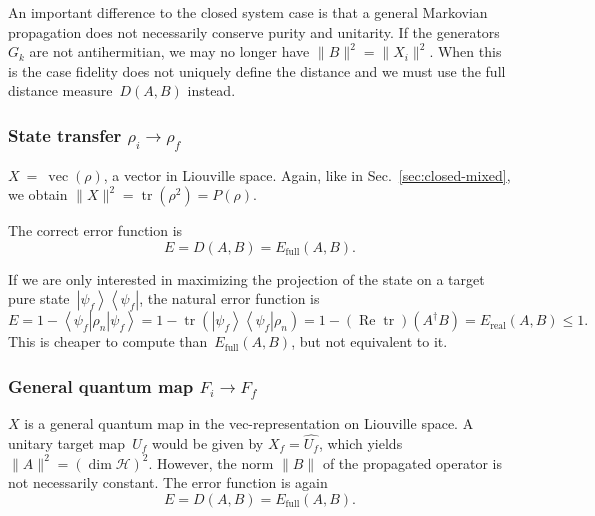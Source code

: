 \documentclass[aps, pra, a4paper, longbibliography, superscriptaddress]{revtex4-1}
\newcommand{\I}{\openone}
\newcommand{\be}{\begin{equation}}
\newcommand{\ee}{\end{equation}}
\newcommand{\eq}{\Leftrightarrow}
\newcommand{\ket}[1]{\left| #1 \right \rangle}
\newcommand{\bra}[1]{\left \langle #1 \right|}
\newcommand{\ketbra}[2]{\left| #1 \right \rangle \left \langle #2 \right|}
\newcommand{\hilb}[1]{\mathcal{#1}}
\DeclareMathOperator{\tr}{tr}
\DeclareMathOperator{\re}{Re}
\DeclareMathOperator{\cvec}{vec}
\newcommand{\vecop}[1]{\widehat{#1}}
\begin{document}
An important difference to the closed system case is that a general Markovian propagation
does not necessarily conserve purity and unitarity.
If the generators~$G_k$ are not antihermitian, we may no longer have
$\|B\|^2 = \|X_i\|^2$. When this is the case
fidelity does not uniquely define the distance and we must use the
full distance measure~$D(A,B)$ instead.






\subsubsection{State transfer $\rho_i \to \rho_f$}

$X~=~\cvec(\rho)$, a vector in Liouville space. Again, like in
Sec.~\ref{sec:closed-mixed}, we obtain
$\|X\|^2 = \tr(\rho^2) = P(\rho)$.

The correct error function is
\be
E
= D(A, B)
= E_\text{full}(A, B).
\ee

If we are only interested in maximizing the projection of
the state on a target pure state~$\ketbra{\psi_f}{\psi_f}$, the natural error
function is
\be
E
= 1 -\bra{\psi_f} \rho_n \ket{\psi_f}
= 1 -\tr\left(\ketbra{\psi_f}{\psi_f} \rho_n \right)
= 1 -(\re \tr)\left(A^\dagger B\right)
= E_\text{real}(A, B) \le 1.
\ee
This is cheaper to compute than~$E_\text{full}(A, B)$, but not equivalent to it.


\subsubsection{General quantum map $F_i \to F_f$}

$X$ is a general quantum map in the vec-representation on Liouville space.
A unitary target map~$U_f$ would be given by
$X_f = \vecop{U_f}$, which yields $\|A\|^2 = (\dim \hilb{H})^2$.
However, the norm $\|B\|$ of the propagated operator
is not necessarily constant. The error function is again
\be
E
= D(A, B)
= E_\text{full}(A, B).
\ee
\end{document}
